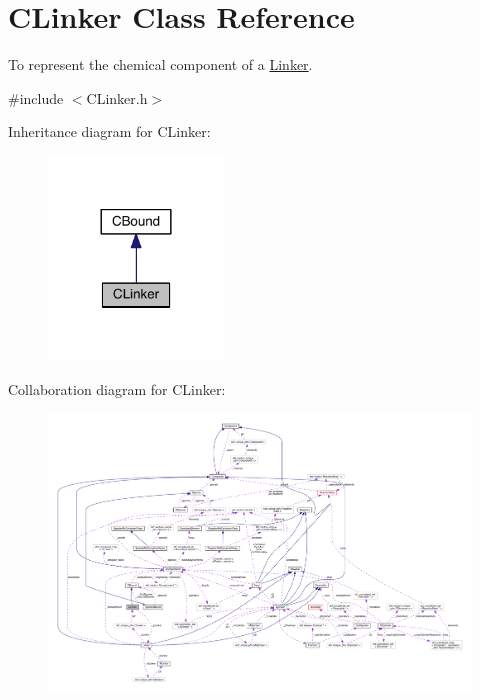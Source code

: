 \hypertarget{classCLinker}{\section{C\+Linker Class Reference}
\label{classCLinker}
}


To represent the chemical component of a \hyperlink{classLinker}{Linker}.  




{\ttfamily \#include $<$C\+Linker.\+h$>$}



Inheritance diagram for C\+Linker\+:\nopagebreak
\begin{figure}[H]
\begin{center}
\leavevmode
\includegraphics[width=132pt]{classCLinker__inherit__graph}
\end{center}
\end{figure}


Collaboration diagram for C\+Linker\+:
\nopagebreak
\begin{figure}[H]
\begin{center}
\leavevmode
\includegraphics[width=350pt]{classCLinker__coll__graph}
\end{center}
\end{figure}

